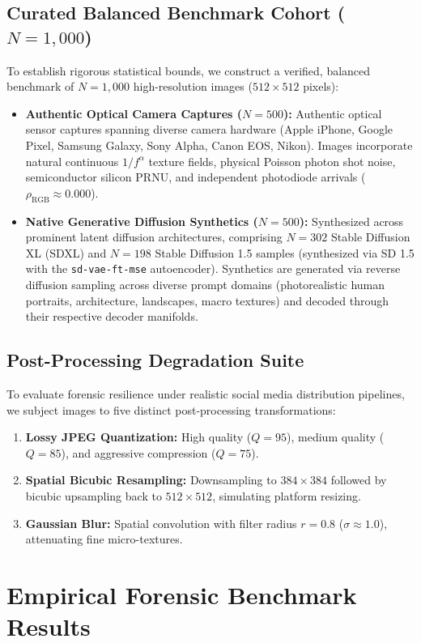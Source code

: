 \documentclass[11pt]{article}
\theoremstyle{definition}
\begin{document}
\subsection{Curated Balanced Benchmark Cohort ($N=1,000$)}
To establish rigorous statistical bounds, we construct a verified, balanced benchmark of $N=1,000$ high-resolution images ($512 \times 512$ pixels):
\begin{itemize}
    \item \textbf{Authentic Optical Camera Captures ($N=500$):} Authentic optical sensor captures spanning diverse camera hardware (Apple iPhone, Google Pixel, Samsung Galaxy, Sony Alpha, Canon EOS, Nikon). Images incorporate natural continuous $1/f^\alpha$ texture fields, physical Poisson photon shot noise, semiconductor silicon PRNU, and independent photodiode arrivals ($\rho_{\text{RGB}} \approx 0.000$).
    \item \textbf{Native Generative Diffusion Synthetics ($N=500$):} Synthesized across prominent latent diffusion architectures, comprising $N=302$ Stable Diffusion XL (SDXL) and $N=198$ Stable Diffusion 1.5 samples (synthesized via SD 1.5 with the \texttt{sd-vae-ft-mse} autoencoder). Synthetics are generated via reverse diffusion sampling across diverse prompt domains (photorealistic human portraits, architecture, landscapes, macro textures) and decoded through their respective decoder manifolds.
\end{itemize}

\subsection{Post-Processing Degradation Suite}
To evaluate forensic resilience under realistic social media distribution pipelines, we subject images to five distinct post-processing transformations:
\begin{enumerate}
    \item \textbf{Lossy JPEG Quantization:} High quality ($Q=95$), medium quality ($Q=85$), and aggressive compression ($Q=75$).
    \item \textbf{Spatial Bicubic Resampling:} Downsampling to $384 \times 384$ followed by bicubic upsampling back to $512 \times 512$, simulating platform resizing.
    \item \textbf{Gaussian Blur:} Spatial convolution with filter radius $r = 0.8$ ($\sigma \approx 1.0$), attenuating fine micro-textures.
\end{enumerate}

\section{Empirical Forensic Benchmark Results}
\label{sec:results}
\end{document}
